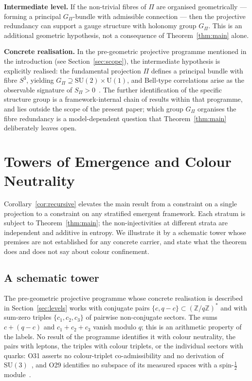 \documentclass[12pt,a4paper]{article}
\begin{document}
  \textbf{Intermediate level.}
  If the non-trivial fibres of $\Pi$ are organised geometrically --- forming a
  principal $G_\Pi$-bundle with admissible connection --- then the projective
  redundancy can support a gauge structure with holonomy group $G_\Pi$.
  This is an additional geometric hypothesis, not a consequence of
  Theorem~\ref{thm:main} alone.

  \textbf{Concrete realisation.}
  In the pre-geometric projective programme mentioned in the introduction
  (see Section~\ref{sec:scope}), the intermediate
  hypothesis is explicitly realised: the fundamental projection $\Pi$ defines a principal
  bundle with fibre $S^3$, yielding $G_\Pi \supseteq \mathrm{SU}(2) \times \mathrm{U}(1)$,
  and Bell-type correlations arise as the observable signature of $S_\Pi > 0$~\citep{Beau2026b}.
  The further identification of the specific structure group is a framework-internal
  chain of results within that programme, and lies outside the scope of the present
  paper; which group $G_\Pi$ organises the fibre redundancy is a model-dependent
  question that Theorem~\ref{thm:main} deliberately leaves open.

  \section{Towers of Emergence and Colour Neutrality}
  \label{sec:towers}

  Corollary~\ref{cor:recursive} elevates the main result from a constraint on a
  single projection to a constraint on any stratified emergent framework.
  Each stratum is subject to Theorem~\ref{thm:main}; the non-injectivities at
  different strata are independent and additive in entropy.
  We illustrate it by a schematic tower whose premises are not established for any concrete
  carrier, and state what the theorem does and does not say about colour confinement.

  \subsection*{A schematic tower}

    The pre-geometric projective programme whose concrete realisation is described in
    Section~\ref{sec:levels} works with conjugate pairs
    $\{c, q-c\} \subset (\mathbb{Z}/q\mathbb{Z})^*$ and with sum-zero triples $\{c_1, c_2, c_3\}$ of
    pairwise non-conjugate sectors.
    The sums $c + (q-c)$ and $c_1 + c_2 + c_3$ vanish modulo $q$; this is an arithmetic property of the labels.
    No result of the programme identifies it with colour neutrality, the pairs with leptons, the triples
    with colour triplets, or the individual sectors with quarks: O31 asserts no colour-triplet
    co-admissibility and no derivation of $\mathrm{SU}(3)$~\citep{Beau2026a35}, and O29 identifies no subspace
    of its measured spaces with a spin-$\frac{1}{2}$ module~\citep{Beau2026a33}.
\end{document}
